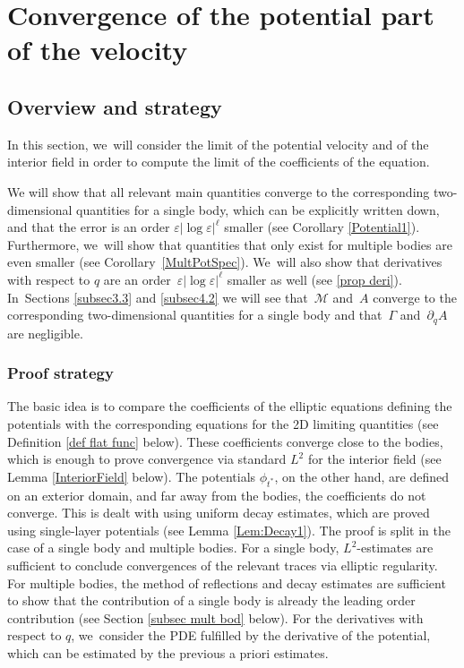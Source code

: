 \documentclass[10pt]{amsart}
\let\epsilon\varepsilon
\theoremstyle{definition}
\let\de\partial
\let\eps\epsilon
\begin{document}
\section{Convergence of the potential part of the velocity}\label{Section3}

\subsection{Overview and strategy}

In this section, we~will consider the limit of the potential velocity and of the interior field in order to compute the limit of the coefficients of the equation.

We will show that all relevant main quantities converge to the corresponding two-dimensional quantities for a single body, which can be explicitly written down, and that the error is an order $\eps|{\log\eps}|^\ell$ smaller (see Corollary \ref{Potential1}). Furthermore, we~will show that quantities that only exist for multiple bodies are even smaller (see Corollary~\ref{MultPotSpec}). We~will also show that derivatives with respect to $q$ are an order~$\eps|{\log\eps}|^\ell$ smaller as well (see \ref{prop deri}). In~Sections \ref{subsec3.3} and \ref{subsec4.2} we will see that~$\mathcal{M}$ and~$A$ converge to the corresponding two-dimensional quantities for a single body and that~$\Gamma$ and~$\de_q A$ are negligible.

\subsubsection{Proof strategy}
The basic idea is to compare the coefficients of the elliptic equations defining the potentials with the corresponding equations for the 2D limiting quantities (see \eg Definition \ref{def flat func} below). These coefficients converge close to the bodies, which is enough to prove convergence via standard $L^2$ for the interior field (see Lemma \ref{InteriorField} below). The potentials $\phi_{t^*}$, on the other hand, are defined on an exterior domain, and far away from the bodies, the coefficients do not converge. This is dealt with using uniform decay estimates, which are proved using single-layer potentials (see Lemma \ref{Lem:Decay1}). The proof is split in the case of a single body and multiple bodies. For a single body, $L^2$-estimates are sufficient to conclude convergences of the relevant traces via elliptic regularity. For multiple bodies, the method of reflections and decay estimates are sufficient to show that the contribution of a single body is already the leading order contribution (see Section \ref{subsec mult bod} below). For the derivatives with respect to $q$, we~consider the PDE fulfilled by the derivative of the potential, which can be estimated by the previous a priori estimates.
\end{document}
